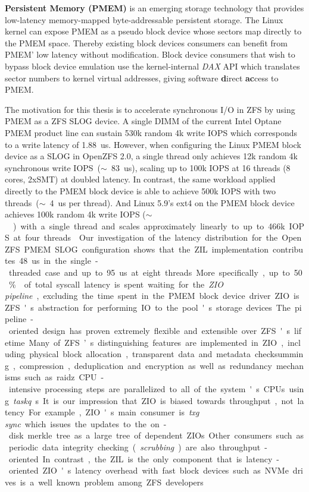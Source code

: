 \documentclass[12pt,a4paper,twoside]{book}
\begin{document}
\textbf{Persistent Memory (PMEM)} is an emerging storage technology that provides low-latency memory-mapped byte-addressable persistent storage.
The Linux kernel can expose PMEM as a pseudo block device whose sectors map directly to the PMEM space.
Thereby existing block devices consumers can benefit from PMEM' low latency without modification.
Block device consumers that wish to bypass block device emulation use the kernel-internal \textit{DAX} API which translates sector numbers to kernel virtual addresses, giving software \textbf{d}irect \textbf{ac}cess to PMEM.

The motivation for this thesis is to accelerate synchronous I/O in ZFS by using PMEM as a ZFS SLOG device.
A single DIMM of the current Intel Optane PMEM product line can sustain 530k random 4k write IOPS which corresponds to a write latency of \SI{1.88}{us}.
However, when configuring the Linux PMEM block device as a SLOG in OpenZFS 2.0, a single thread only achieves 12k random 4k synchronous write IOPS~($\sim$~\SI{83}{us}), scaling up to 100k IOPS at 16 threads (8 cores, 2xSMT) at doubled latency.
In contrast, the same workload applied directly to the PMEM block device is able to achieve 500k IOPS with two threads~($\sim$~\SI{4}{us} per thread).
And Linux 5.9's ext4 on the PMEM block device achieves 100k random 4k write IOPS ($\sim$~\SI{}) with a single thread and scales approximately linearly to up to 466k IOPS at four threads.

Our investigation of the latency distribution for the OpenZFS PMEM SLOG configuration shows that the ZIL implementation contributes \SI{48}{us} in the single-threaded case and up to \SI{95}{us} at eight threads.
More specifically, up to \SI{50}{\%} of total syscall latency is spent waiting for the \textit{ZIO pipeline}, excluding the time spent in the PMEM block device driver.

ZIO is ZFS's abstraction for performing IO to the pool's storage devices.
The pipeline-oriented design has proven extremely flexible and extensible over ZFS's lifetime.
Many of ZFS’s distinguishing features are implemented in ZIO, including physical block allocation, transparent data and metadata checksumming, compression, deduplication and encryption as well as redundancy mechanisms such as raidz.
CPU-intensive processing steps are parallelized to all of the system's CPUs using \textit{taskq}s.

It is our impression that ZIO is biased towards throughput, not latency.
For example, ZIO's main consumer is \textit{txg sync} which issues the updates to the on-disk merkle tree as a large tree of dependent ZIOs.
Other consumers such as periodic data integrity checking (\textit{scrubbing}) are also throughput-oriented.
In contrast, the ZIL is the only component that is latency-oriented.
ZIO's latency overhead with fast block devices such as NVMe drives is a well known problem among ZFS developers.
\end{document}
